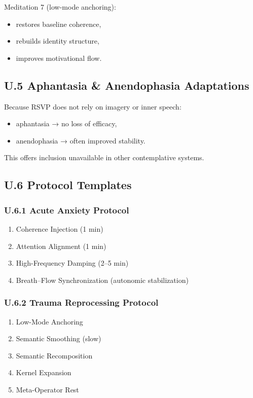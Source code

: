 \documentclass[12pt]{article}
\begin{document}
Meditation 7 (low-mode anchoring):

\begin{itemize}
\item restores baseline coherence,
\item rebuilds identity structure,
\item improves motivational flow.
\end{itemize}

\subsection*{U.5 Aphantasia \& Anendophasia Adaptations}

Because RSVP does not rely on imagery or inner speech:

\begin{itemize}
\item aphantasia → no loss of efficacy,
\item anendophasia → often improved stability.
\end{itemize}

This offers inclusion unavailable in other contemplative systems.

\subsection*{U.6 Protocol Templates}

\subsubsection*{U.6.1 Acute Anxiety Protocol}

\begin{enumerate}
\item Coherence Injection (1 min)
\item Attention Alignment (1 min)
\item High-Frequency Damping (2--5 min)
\item Breath--Flow Synchronization (autonomic stabilization)
\end{enumerate}

\subsubsection*{U.6.2 Trauma Reprocessing Protocol}

\begin{enumerate}
\item Low-Mode Anchoring
\item Semantic Smoothing (slow)
\item Semantic Recomposition
\item Kernel Expansion
\item Meta-Operator Rest
\end{enumerate}
\end{document}
